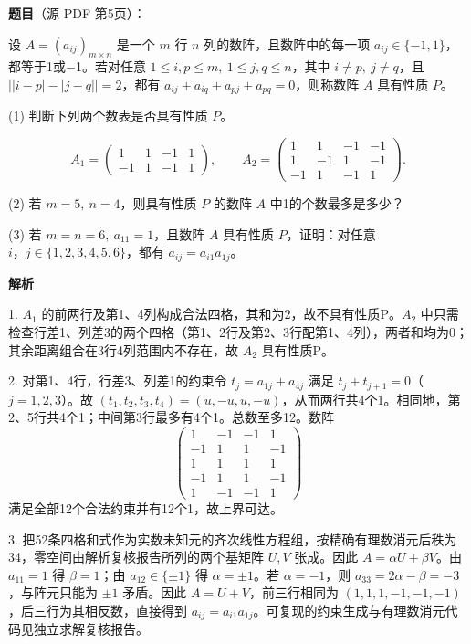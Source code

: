 \begin{answer}

\textbf{题目}（源 PDF 第5页）：

设 \(A=(a_{ij})_{m\times n}\) 是一个 \(m\) 行 \(n\) 列的数阵，且数阵中的每一项 \(a_{ij}\in\{-1,1\}\)，都等于1或$-$1。若对任意 \(1\leq i,p\leq m,\ 1\leq j,q\leq n\)，其中 \(i\ne p,\ j\ne q\)，且 \(\bigl\lvert\lvert i-p\rvert-\lvert j-q\rvert\bigr\rvert=2\)，都有 \(a_{ij}+a_{iq}+a_{pj}+a_{pq}=0\)，则称数阵 \(A\) 具有性质 \(P\)。

(1) 判断下列两个数表是否具有性质 \(P\)。

\nopagebreak[4]
\[
A_1=
\begin{pmatrix}
1&1&-1&1\\
-1&1&-1&1
\end{pmatrix},
\qquad
A_2=
\begin{pmatrix}
1&1&-1&-1\\
1&-1&1&-1\\
-1&1&-1&1
\end{pmatrix}.
\]

(2) 若 \(m=5,\ n=4\)，则具有性质 \(P\) 的数阵 \(A\) 中1的个数最多是多少？

(3) 若 \(m=n=6,\ a_{11}=1\)，且数阵 \(A\) 具有性质 \(P\)，证明：对任意 \(i，j\in\{1,2,3,4,5,6\}\)，都有 \(a_{ij}=a_{i1}a_{1j}\)。

\textbf{解析}


1. \(A_1\) 的前两行及第1、4列构成合法四格，其和为2，故不具有性质P。\(A_2\) 中只需检查行差1、列差3的两个四格（第1、2行及第2、3行配第1、4列），两者和均为0；其余距离组合在3行4列范围内不存在，故 \(A_2\) 具有性质P。

2. 对第1、4行，行差3、列差1的约束令 \(t_j=a_{1j}+a_{4j}\) 满足 \(t_j+t_{j+1}=0\)（\(j=1,2,3\)）。故 \((t_1,t_2,t_3,t_4)=(u,-u,u,-u)\)，从而两行共4个1。相同地，第2、5行共4个1；中间第3行最多有4个1。总数至多12。数阵
\nopagebreak[4]
\[
   \begin{pmatrix}
   1&-1&-1&1\\
   -1&1&1&-1\\
   1&1&1&1\\
   -1&1&1&-1\\
   1&-1&-1&1
   \end{pmatrix}
\]
   满足全部12个合法约束并有12个1，故上界可达。

3. 把52条四格和式作为实数未知元的齐次线性方程组，按精确有理数消元后秩为34，零空间由解析复核报告所列的两个基矩阵 \(U,V\) 张成。因此 \(A=\alpha U+\beta V\)。由 \(a_{11}=1\) 得 \(\beta=1\)；由 \(a_{12}\in\{\pm1\}\) 得 \(\alpha=\pm1\)。若 \(\alpha=-1\)，则 \(a_{33}=2\alpha-\beta=-3\)，与阵元只能为 \(\pm1\) 矛盾。因此 \(A=U+V\)，前三行相同为 \((1,1,1,-1,-1,-1)\)，后三行为其相反数，直接得到 \(a_{ij}=a_{i1}a_{1j}\)。可复现的约束生成与有理数消元代码见独立求解复核报告。




\end{answer}